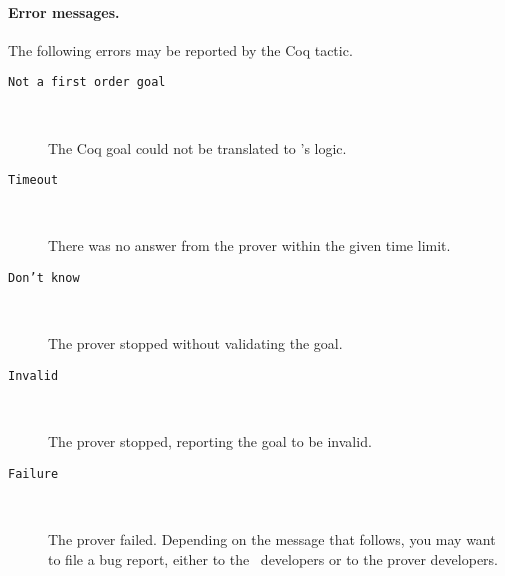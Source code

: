 \paragraph{Error messages.} The following errors may be reported by
the Coq tactic.
\begin{description}
\item[\texttt{Not a first order goal}] ~\par
  The Coq goal could not be translated to \why's logic.
\item[\texttt{Timeout}] ~\par
  There was no answer from the prover within the given time limit.
\item[\texttt{Don't know}] ~\par
  The prover stopped without validating the goal.
\item[\texttt{Invalid}] ~\par
  The prover stopped, reporting the goal to be invalid.
\item[\texttt{Failure}] ~\par
  The prover failed. Depending on the message that follows, you may
  want to file a bug report, either to the \why\ developers or to the
  prover developers.
\end{description}


